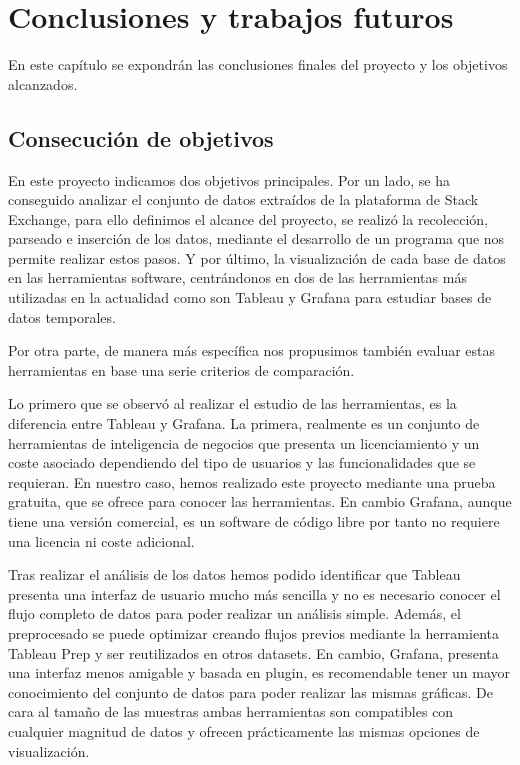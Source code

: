 \documentclass[a4paper, 12pt]{book}
\begin{document}
\cleardoublepage



\chapter{Conclusiones y trabajos futuros}
\label{chap:conclusiones}
En este capítulo se expondrán las conclusiones finales del proyecto y los objetivos alcanzados.

\section{Consecución de objetivos}
\label{sec:consecucion-objetivos}

En este proyecto indicamos dos objetivos principales. Por un lado, se ha conseguido analizar el conjunto de datos extraídos de la plataforma de Stack Exchange, para ello definimos el alcance del proyecto, se realizó la recolección, parseado e inserción de los datos, mediante el desarrollo de un programa que nos permite realizar estos pasos. Y por último, la visualización de cada base de datos en las herramientas software, centrándonos en dos de las herramientas más utilizadas en la actualidad como son Tableau y Grafana para estudiar bases de datos temporales. 

Por otra parte, de manera más específica nos propusimos también evaluar estas herramientas en base una serie criterios de comparación. 

Lo primero que se observó al realizar el estudio de las herramientas, es la diferencia entre Tableau y Grafana. La primera, realmente es un conjunto de herramientas de inteligencia de negocios que presenta un licenciamiento y un coste asociado dependiendo del tipo de usuarios y las funcionalidades que se requieran. En nuestro caso, hemos realizado este proyecto mediante una prueba gratuita, que se ofrece para conocer las herramientas. En cambio Grafana, aunque tiene una versión comercial, es un software de código libre por tanto no requiere una licencia ni coste adicional. 

Tras realizar el análisis de los datos hemos podido identificar que Tableau presenta una interfaz de usuario mucho más sencilla y no es necesario conocer el flujo completo de datos para poder realizar un análisis simple. Además, el preprocesado se puede optimizar creando flujos previos mediante la herramienta Tableau Prep y ser reutilizados en otros datasets. En cambio, Grafana, presenta una interfaz menos amigable y basada en \gls{plugin}, es recomendable tener un mayor conocimiento del conjunto de datos para poder realizar las mismas gráficas.
De cara al tamaño de las muestras ambas herramientas son compatibles con cualquier magnitud de datos y ofrecen prácticamente las mismas opciones de visualización. 
\end{document}

